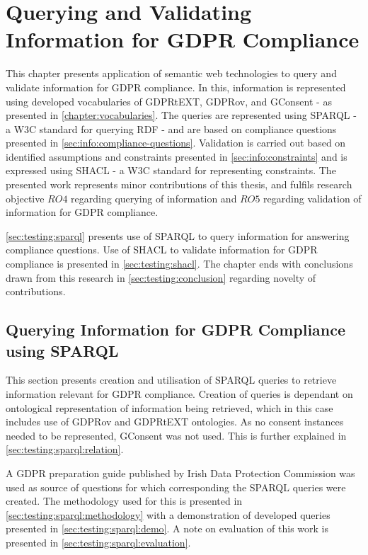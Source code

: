 \chapter{Querying and Validating Information for GDPR Compliance}
\label{chapter:testing}
This chapter presents application of semantic web technologies to query and validate information for GDPR compliance.
In this, information is represented using developed vocabularies of GDPRtEXT, GDPRov, and GConsent - as presented in \autoref{chapter:vocabularies}.
The queries are represented using SPARQL - a W3C standard for querying RDF - and are based on compliance questions presented in \autoref{sec:info:compliance-questions}.
Validation is carried out based on identified assumptions and constraints presented in \autoref{sec:info:constraints} and is expressed using SHACL - a W3C standard for representing constraints.
The presented work represents minor contributions of this thesis, and fulfils research objective $RO4$ regarding querying of information and $RO5$ regarding validation of information for GDPR compliance.

\autoref{sec:testing:sparql} presents use of SPARQL to query information for answering compliance questions.
Use of SHACL to validate information for GDPR compliance is presented in \autoref{sec:testing:shacl}.
The chapter ends with conclusions drawn from this research in \autoref{sec:testing:conclusion} regarding novelty of contributions.

\section{Querying Information for GDPR Compliance using SPARQL}\label{sec:testing:sparql}
This section presents creation and utilisation of SPARQL queries to retrieve information relevant for GDPR compliance.
Creation of queries is dependant on ontological representation of information being retrieved, which in this case includes use of GDPRov and GDPRtEXT ontologies.
As no consent instances needed to be represented, GConsent was not used.
This is further explained in \autoref{sec:testing:sparql:relation}.

A GDPR preparation guide published by Irish Data Protection Commission was used as source of questions for which corresponding the SPARQL queries were created. The methodology used for this is presented in \autoref{sec:testing:sparql:methodology} with a demonstration of developed queries presented in \autoref{sec:testing:sparql:demo}.
A note on evaluation of this work is presented in \autoref{sec:testing:sparql:evaluation}.

